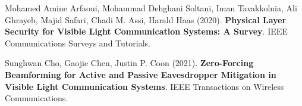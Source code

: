 \documentclass[a4paper,12pt,twoside]{article}
\begin{document}
	
	\newpage 

	\begin{thebibliography}{9}
		 Mohamed Amine Arfaoui, Mohammad Dehghani Soltani, Iman Tavakkolnia, Ali Ghrayeb, Majid Safari, Chadi M. Assi, Harald Haas (2020). \textbf{Physical Layer Security for Visible Light
		Communication Systems: A Survey}. IEEE Communications Surveys and Tutorials.
		
		Sunghwan Cho, Gaojie Chen, Justin P. Coon (2021). \textbf{Zero-Forcing Beamforming for Active and Passive Eavesdropper Mitigation in Visible Light Communication Systems}. IEEE Transactions on Wireless Communications.
	\end{thebibliography}
	
\end{document}
